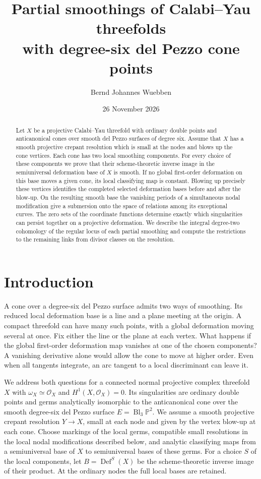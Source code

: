 \documentclass[11pt]{amsart}
\title[Partial smoothings of Calabi--Yau threefolds]{Partial smoothings of Calabi--Yau threefolds\\ with degree-six del Pezzo cone points}
\author{Bernd Johannes Wuebben}
\date{26 November 2026}
\theoremstyle{definition}\newtheorem{example}[theorem]{Example}
\theoremstyle{remark}\newtheorem{remark}[theorem]{Remark}
\newcommand{\PP}{\mathbb P}
\newcommand{\cO}{\mathcal O}
\DeclareMathOperator{\Def}{Def}
\begin{document}
\begin{abstract}
Let $X$ be a projective Calabi--Yau threefold with ordinary double points
and anticanonical cones over smooth del Pezzo surfaces of degree six.
Assume that $X$ has a smooth projective crepant resolution which is small
at the nodes and blows up the cone vertices. Each cone has two local
smoothing components. For every choice of these components we prove that
their scheme-theoretic inverse image in the semiuniversal deformation
base of $X$ is smooth. If no global first-order deformation on this base
moves a given cone, its local classifying map is constant. Blowing up
precisely these vertices identifies the completed selected deformation
bases before and after the blow-up. On the resulting smooth base the
vanishing periods of a simultaneous nodal modification give a submersion
onto the space of relations among its exceptional curves. The zero sets of the coordinate
functions determine exactly which singularities can persist together on
a projective deformation. We describe the integral degree-two cohomology
of the regular locus of each partial smoothing and compute the restrictions
to the remaining links from divisor classes on the resolution.
\end{abstract}
\maketitle
\section{Introduction}
A cone over a degree-six del Pezzo surface admits two ways of smoothing.
Its reduced local deformation base is a line and a plane meeting at the
origin. A compact threefold can have many such points, with a global
deformation moving several at once. Fix either the line or the plane at
each vertex. What happens if the global first-order deformation map
vanishes at one of the chosen components? A vanishing derivative alone
would allow the cone to move at higher order. Even when all tangents
integrate, an arc tangent to a local discriminant can leave it.

We address both questions for a connected normal projective complex
threefold $X$ with $\omega_X\simeq\cO_X$ and $H^1(X,\cO_X)=0$.
Its singularities are ordinary double points and germs analytically
isomorphic to the anticanonical cone over the smooth degree-six del
Pezzo surface $E=\operatorname{Bl}_3\PP^2$. We assume a smooth projective
crepant resolution $Y\to X$, small at each node and given by the vertex
blow-up at each cone. Choose markings of the local germs, compatible
small resolutions in the local nodal modifications described below, and
analytic classifying maps from a semiuniversal base of $X$ to
semiuniversal bases of these germs. For a choice $S$ of the local
components, let $B=\Def^S(X)$ be the scheme-theoretic inverse image
of their product. At the ordinary nodes the full local bases are retained.
\end{document}
